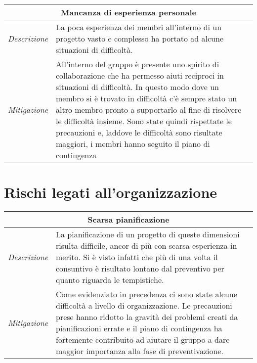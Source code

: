 \begin{table}[H]
    \centering
    \begin{tabular}{|p{2cm}|p{10cm}|}
    \hline
    \multicolumn{2}{|c|}{\textbf{Mancanza di esperienza personale}} \\ \hline
    \multicolumn{1}{|l|}{\textit{Descrizione}} & La poca esperienza dei membri all'interno di un progetto vasto e complesso ha portato ad alcune situazioni di difficoltà. \\ \hline
    \multicolumn{1}{|l|}{\textit{Mitigazione}} & All'interno del gruppo è presente uno spirito di collaborazione che ha permesso aiuti reciproci in situazioni di difficoltà. In questo modo dove un membro si è trovato in difficoltà c'è sempre stato un altro membro pronto a supportarlo al fine di risolvere le difficoltà insieme. Sono state quindi rispettate le precauzioni e, laddove le difficoltà sono risultate maggiori, i membri hanno seguito il piano di contingenza \\ \hline
    \end{tabular}
\end{table}



\section{Rischi legati all'organizzazione}

\begin{table}[H]
    \centering
    \begin{tabular}{|p{2cm}|p{10cm}|}
    \hline
    \multicolumn{2}{|c|}{\textbf{Scarsa pianificazione}} \\ \hline
    \multicolumn{1}{|l|}{\textit{Descrizione}} & La pianificazione di un progetto di queste dimensioni risulta difficile, ancor di più con scarsa esperienza in merito. Si è visto infatti che più di una volta il consuntivo è risultato lontano dal preventivo per quanto riguarda le tempistiche. \\ \hline
    \multicolumn{1}{|l|}{\textit{Mitigazione}} & Come evidenziato in precedenza ci sono state alcune difficoltà a livello di organizzazione. Le precauzioni prese hanno ridotto la gravità dei problemi creati da pianificazioni errate e il piano di contingenza ha fortemente contribuito ad aiutare il gruppo a dare maggior importanza alla fase di preventivazione. \\ \hline
    \end{tabular}
\end{table}



